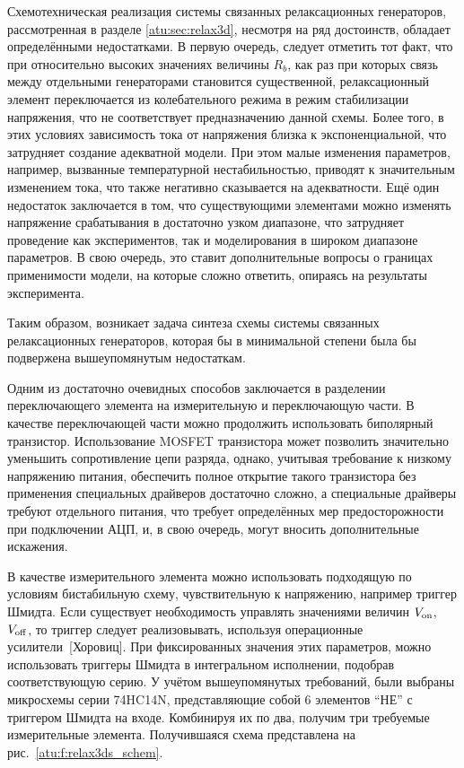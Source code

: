 Схемотехническая реализация системы связанных релаксационных генераторов,
рассмотренная в разделе \ref{atu:sec:relax3d}, несмотря на ряд достоинств,
обладает определёнными недостатками. В первую очередь, следует отметить
тот факт, что при относительно высоких значениях величины $R_b$,
как раз при которых связь между отдельными генераторами становится существенной,
релаксационный элемент переключается из колебательного режима в режим
стабилизации напряжения, что не соответствует предназначению данной схемы.
Более того, в этих условиях зависимость тока от напряжения близка к экспоненциальной,
что затрудняет создание адекватной модели. При этом малые изменения параметров,
например, вызванные температурной нестабильностью, приводят к значительным изменением
тока, что также негативно сказывается на адекватности. Ещё один недостаток
заключается в том, что существующими элементами можно изменять напряжение срабатывания
в достаточно узком диапазоне, что затрудняет проведение как экспериментов,
так и моделирования в широком диапазоне параметров. В свою очередь,
это ставит дополнительные вопросы о границах применимости модели, на которые сложно
ответить, опираясь на результаты эксперимента.

Таким образом, возникает задача синтеза схемы системы связанных
релаксационных генераторов, которая бы в минимальной степени была бы
подвержена вышеупомянутым недостаткам.

Одним из достаточно очевидных способов заключается
в разделении переключающего элемента
на измерительную и переключающую части.
В качестве переключающей части можно продолжить использовать биполярный
транзистор. Использование MOSFET транзистора может позволить
значительно уменьшить сопротивление цепи разряда, однако,
учитывая требование к низкому напряжению питания,
обеспечить полное открытие такого транзистора
без применения специальных драйверов достаточно сложно,
а специальные драйверы требуют отдельного питания,
что требует определённых мер предосторожности при подключении АЦП,
и, в свою очередь, могут вносить дополнительные искажения.

В качестве измерительного элемента можно использовать
подходящую по условиям бистабильную схему,
чувствительную к напряжению, например триггер Шмидта.
Если существует необходимость управлять
значениями величин
$V_\mathrm{on}$, $V_\mathrm{off}$,
то триггер следует реализовывать,
используя операционные усилители~[Хоровиц].
При фиксированных значения этих параметров,
можно использовать триггеры Шмидта в интегральном исполнении,
подобрав соответствующую серию.
У учётом вышеупомянутых требований,
были выбраны микросхемы серии 74HC14N,
представляющие собой 6 элементов ``НЕ''
с триггером Шмидта на входе. Комбинируя их по два,
получим три требуемые измерительные элемента.
Получившаяся схема представлена на рис.~\ref{atu:f:relax3ds_schem}.


